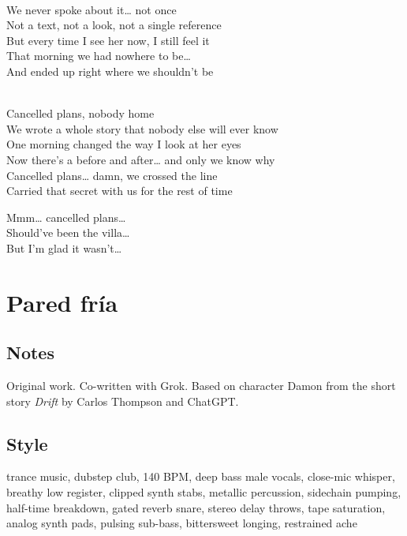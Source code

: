 \begin{lyrics}
\\
We never spoke about it… not once\\
Not a text, not a look, not a single reference\\
But every time I see her now, I still feel it\\
That morning we had nowhere to be…\\
And ended up right where we shouldn’t be

\\
Cancelled plans, nobody home\\
We wrote a whole story that nobody else will ever know\\
One morning changed the way I look at her eyes\\
Now there’s a before and after… and only we know why\\
Cancelled plans… damn, we crossed the line\\
Carried that secret with us for the rest of time

Mmm… cancelled plans…\\
Should’ve been the villa…\\
But I’m glad it wasn’t…

\end{lyrics}

\section{Pared fría}

\subsection{Notes}
Original work.
Co-written with Grok.
Based on character Damon from the short story \emph{Drift} by Carlos Thompson and ChatGPT.

\subsection{Style}
trance music, dubstep club, 140 BPM, deep bass male vocals, close-mic whisper, breathy low register, clipped synth stabs, metallic percussion, sidechain pumping, half-time breakdown, gated reverb snare, stereo delay throws, tape saturation, analog synth pads, pulsing sub-bass, bittersweet longing, restrained ache

